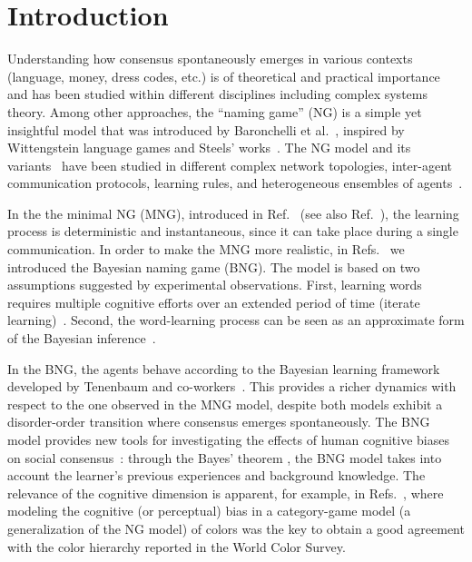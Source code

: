 \documentclass[review]{elsarticle}
\newcommand{\+}{\! + \!}
\begin{document}



\section{Introduction}


Understanding how consensus spontaneously emerges in various contexts (language, money, dress codes, etc.) \cite{Erlich2005, Nyborg2016, Baronchelli-2018a}  is of theoretical and practical importance and has been studied within different disciplines including complex systems theory.
Among other approaches, the ``naming game'' (NG) is a simple yet insightful model that was introduced by Baronchelli et al.~\cite{Baronchelli-2006c, chen-2019a}, inspired by Wittengstein language games \cite{Wittgenstein-1953} and Steels' works~\cite{Steels-1995a,Steels-1997b}. 
The NG model and its variants~\cite{Baronchelli-2006a, Baronchelli-2007a, Baronchelli-2007b} have been studied in different complex network topologies, 
inter-agent communication protocols, 
learning rules, 
and heterogeneous ensembles of agents~\cite{Marchetti-2020b,Patriarca-2020a}.



In the the minimal NG (MNG), introduced in Ref.~\cite{Baronchelli-2006a} (see also Ref.~\cite{Baronchelli-2016a}), the learning process is deterministic and instantaneous, since it can take place during a single communication.
In order to make the MNG more realistic, in Refs.~\cite{Marchetti-2020a, Marchetti-2020b} we introduced the Bayesian naming game (BNG). 
The model is based on two assumptions suggested by experimental observations.
First, learning words requires multiple cognitive efforts over an extended period of time (iterate learning)~\cite{Tenenbaum-1999, Griffiths-2007}. 
Second, the word-learning process can be seen as an approximate form of the Bayesian inference~\cite{Tenenbaum-1999, Tenenbaum-1999b, Tenenbaum-2000b, Tenenbaum2001, Xu-2007a, Perfors-2011a, Murphy-2012a}.


In the BNG, the agents behave according to the Bayesian learning framework developed by Tenenbaum  and co-workers~\cite{Tenenbaum-1999,Tenenbaum-2011a,Perfors-2011a,Murphy-2012a,Lake2015}.
This provides a richer dynamics with respect to the one observed in the MNG model, despite both  models exhibit a disorder-order transition where consensus emerges spontaneously.
The BNG model provides new tools for investigating the effects of human cognitive biases on social consensus~\cite{Tversky1974,  Hahn2014, Sanborn2016, Ngam2016, madsen2018}: through the Bayes' theorem \cite{Jeffreys1961}, the BNG model takes into account the learner's previous experiences and background knowledge.  
The relevance of the cognitive dimension is apparent, for example, in Refs.~\cite{Baronchelli2010e, Loreto2012, Baronchelli-2015}, where modeling the cognitive (or perceptual) bias in a category-game model (a generalization of the NG model) of colors was the key to obtain a good agreement with the color hierarchy reported in the World Color Survey.
\end{document}
